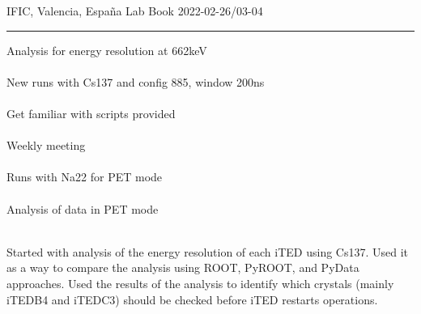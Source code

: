 \begin{center}
  {\Large IFIC, Valencia, España} \hfill {\Large Lab Book} \hfill {\Large 2022-02-26/03-04}\\
  \rule{\textwidth}{1pt}
\end{center}

\begin{minipage}[t][0.45\textheight][t]{0.97\linewidth}
  \begin{minipage}[t]{0.49\textwidth}
    \hspace{10pt}Analysis for energy resolution at 662keV\\~\\
    \hspace{10pt}New runs with Cs137 and config 885, window 200ns\\~\\
    \hspace{10pt}Get familiar with scripts provided\\~\\
    \hspace{10pt}Weekly meeting\\~\\
    \hspace{10pt}Runs with Na22 for PET mode\\~\\
    \hspace{10pt}Analysis of data in PET mode\\~\\
  \end{minipage}
  \begin{minipage}[t]{0.49\textwidth}
    \begin{minipage}[t][0.22\textheight][t]{\textwidth}
        Started with analysis of the energy resolution of each iTED using Cs137. Used it as a way to compare the analysis using ROOT, PyROOT, and PyData approaches. Used the results of the analysis to identify which crystals (mainly iTEDB4 and iTEDC3) should be checked before iTED restarts operations.
    \end{minipage}
    \begin{minipage}[t][0.22\textheight][t]{\textwidth}
    \end{minipage}
  \end{minipage}  
\end{minipage}

